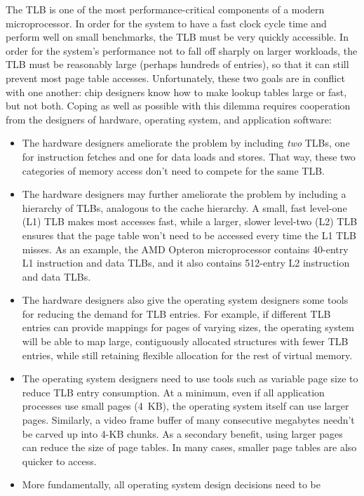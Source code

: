 The TLB is one of the most performance-critical components of a modern
microprocessor.  In order for the system to have a fast clock cycle
time and perform well on small benchmarks, the TLB must be very
quickly accessible.  In order for the system's performance not to fall
off sharply on larger workloads, the TLB must be reasonably large
(perhaps hundreds of entries), so that it can still prevent most page
table accesses.  Unfortunately, these two goals are in conflict with
one another: chip designers know how to make lookup tables large or
fast, but not both.  Coping as well as possible with this dilemma
requires cooperation from the designers of hardware, operating system,
and application software:
\begin{itemize}
\item
The hardware designers ameliorate the problem by including
{\em two} TLBs, one for instruction fetches and one for data loads
and stores.  That way, these two categories of memory access don't
need to compete for the same TLB.
\item
The hardware designers may further ameliorate the problem by including
a hierarchy of TLBs, analogous to the cache hierarchy.  A small, fast
level-one (L1) TLB makes most accesses fast, while a larger,
slower level-two (L2) TLB ensures that the page table won't need to be
accessed every time the L1 TLB misses.  As an example, the AMD Opteron
microprocessor contains 40-entry L1 instruction and data TLBs,
and it also contains 512-entry L2 instruction and data TLBs.
\item
The hardware designers also give the operating system designers some
tools for reducing the demand for TLB entries.  For example, if
different TLB entries can provide mappings for pages of varying sizes,
the operating system will be able to map large, contiguously allocated
structures with fewer TLB entries, while still retaining flexible
allocation for the rest of virtual memory.
\item
The operating system designers need to use tools such as variable page
size to reduce TLB entry consumption.  At a minimum, even if all
application processes use small pages (4~KB), the operating system
itself can use larger pages.  Similarly, a video frame buffer of many
consecutive megabytes needn't be carved up into 4-KB chunks.  As a
secondary benefit, using larger pages can reduce the size of page tables.
In many cases, smaller page tables are also quicker to access.
\item
More fundamentally, all operating system design decisions need to be

\end{itemize}

